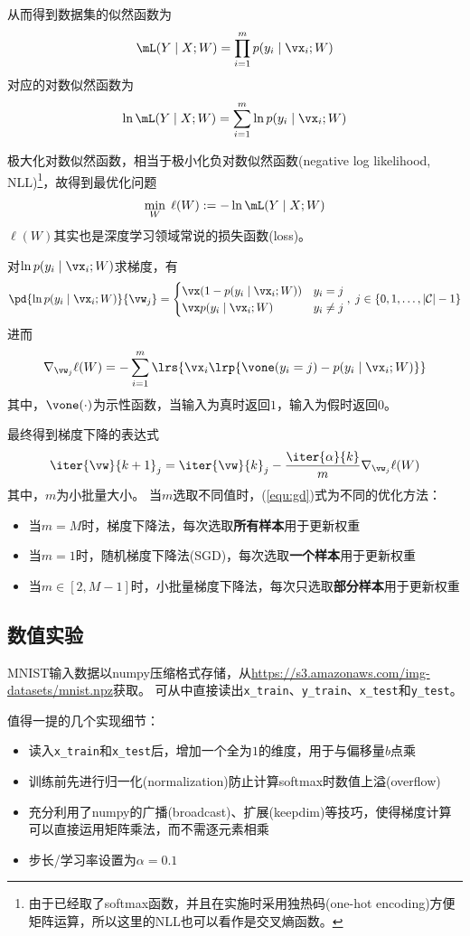 \documentclass[logo,reportComp]{thesis}
\begin{document}
从而得到数据集的似然函数为
\[\mL(Y\mid X;W)=\prod_{i=1}^m p(y_i\mid\vx_i;W)\]
对应的对数似然函数为
\[\ln\mL(Y\mid X;W)=\sum_{i=1}^m\ln p(y_i\mid\vx_i;W)\]

极大化对数似然函数，相当于极小化负对数似然函数(negative log likelihood, NLL)\footnote{由于已经取了softmax函数，并且在实施时采用独热码(one-hot encoding)方便矩阵运算，所以这里的NLL也可以看作是交叉熵函数。}，故得到最优化问题
\begin{equation}
\min_W \;\ell(W):=-\ln\mL(Y\mid X;W)
\end{equation}
$\ell(W)$其实也是深度学习领域常说的损失函数(loss)。

对$\ln p(y_i\mid\vx_i;W)$求梯度，有
\[\pd{\ln p(y_i\mid\vx_i;W)}{\vw_j}=
\begin{cases}
\vx(1-p(y_i\mid\vx_i;W)) & y_i=j\\
\vx p(y_i\mid\vx_i;W) & y_i\ne j
\end{cases},\;j\in\{0,1,\ldots,|\mathcal{C}|-1\}\]
进而
\begin{equation}
\nabla_{\vw_j}\ell(W)=-\sum_{i=1}^m\lrs{\vx_i\lrp{\vone(y_i=j)-p(y_i\mid\vx_i;W)}}
\end{equation}
其中，$\vone(\cdot)$为示性函数，当输入为真时返回$1$，输入为假时返回$0$。

最终得到梯度下降的表达式
\begin{equation}
\label{equ:gd}
\iter{\vw}{k+1}_j=\iter{\vw}{k}_j-\frac{\iter{\alpha}{k}}{m}\nabla_{\vw_j}\ell(W)
\end{equation}
其中，$m$为小批量大小。
当$m$选取不同值时，(\ref{equ:gd})式为不同的优化方法：
\begin{itemize}
\item 当$m=M$时，梯度下降法，每次选取\textbf{所有样本}用于更新权重
\item 当$m=1$时，随机梯度下降法(SGD)，每次选取\textbf{一个样本}用于更新权重
\item 当$m\in[2,M-1]$时，小批量梯度下降法，每次只选取\textbf{部分样本}用于更新权重
\end{itemize}

\subsection{数值实验}
MNIST输入数据以numpy压缩格式存储，从\url{https://s3.amazonaws.com/img-datasets/mnist.npz}获取。
可从中直接读出\verb'x_train'、\verb'y_train'、\verb'x_test'和\verb'y_test'。

值得一提的几个实现细节：
\begin{itemize}
	\item 读入\verb'x_train'和\verb'x_test'后，增加一个全为$1$的维度，用于与偏移量$b$点乘
	\item 训练前先进行归一化(normalization)防止计算softmax时数值上溢(overflow) %
	\item 充分利用了numpy的广播(broadcast)、扩展(keepdim)等技巧，使得梯度计算可以直接运用矩阵乘法，而不需逐元素相乘
	\item 步长/学习率设置为$\alpha=0.1$
\end{itemize}
\end{document}
